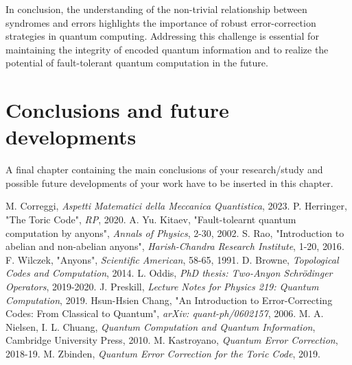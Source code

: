\documentclass{Configuration_Files/PoliMi3i_thesis}
\begin{document}
In conclusion, the understanding of the non-trivial relationship between syndromes and errors highlights the importance of robust error-correction strategies in quantum computing. Addressing this challenge is essential for maintaining the integrity of encoded quantum information and to realize the potential of fault-tolerant quantum computation in the future. \newline























\chapter{Conclusions and future developments}
\label{ch:conclusions}%
A final chapter containing the main conclusions of your research/study
and possible future developments of your work have to be inserted in this chapter.


\begin{thebibliography}{99} %
	 M. Correggi, \textit{Aspetti Matematici della Meccanica Quantistica}, 2023.
	 P. Herringer, "The Toric Code", {\it RP}, 2020.
	 A. Yu. Kitaev, "Fault-tolearnt quantum computation by anyons", {\it Annals of Physics}, 2-30, 2002.
	 S. Rao, "Introduction to abelian and non-abelian anyons", {\it Harish-Chandra Research Institute}, 1-20, {2016}.
	 F. Wilczek, "Anyons", {\it Scientific American}, 58-65, 1991.
	 D. Browne, {\it Topological Codes and Computation}, 2014.
	 L. Oddis, {\it PhD thesis: Two-Anyon Schrödinger Operators}, 2019-2020.
	 J. Preskill, {\it Lecture Notes for Physics 219:
	 Quantum Computation}, 2019.
	 Hsun-Hsien Chang, "An Introduction to Error-Correcting Codes: From Classical to Quantum", {\it arXiv: quant-ph/0602157}, 2006.
	 M. A. Nielsen, I. L. Chuang, {\it Quantum Computation and Quantum Information}, Cambridge University Press, 2010.
	 M. Kastroyano, {\it Quantum Error Correction}, 2018-19.
	 M. Zbinden, {\it Quantum Error Correction for the Toric Code}, 2019.
\end{thebibliography}
\end{document}
